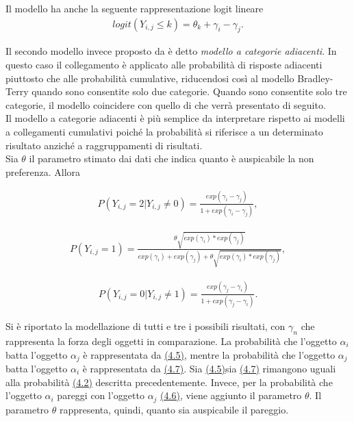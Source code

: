 Il modello ha anche la seguente rappresentazione logit lineare 
\begin{align}
	logit(Y_{i,j}\leq k) =  \theta_{k} + \gamma_i - \gamma_j.
\end{align}

Il secondo modello invece proposto da \textcite{agresti1992analysis} è detto \emph{modello a categorie adiacenti}. In questo caso il collegamento è applicato alle probabilità di risposte adiacenti piuttosto che alle probabilità cumulative, riducendosi così al modello Bradley-Terry quando sono consentite solo due categorie. Quando sono consentite solo tre categorie, il modello coincidere con quello di \textcite{davidson1970extending} che verrà presentato di seguito.\\
Il modello a categorie adiacenti è più semplice da interpretare rispetto ai modelli a collegamenti cumulativi poiché la probabilità si riferisce a un determinato risultato anziché a raggruppamenti di risultati. \\
Sia $\theta$ il parametro stimato dai dati che indica quanto è auspicabile la non preferenza. Allora \autocite{davidson1970extending}

\begin{align}
	P(Y_{i,j} = 2 | Y_{i,j} \not = 0) =  \frac{exp(\gamma_{i} - \gamma_{j})}{1 + exp(\gamma_{i} - \gamma_{j})}, \label{for:4.5}
\end{align}
	
\begin{align}
	P(Y_{i,j} = 1) =  \frac{\theta \sqrt{exp(\gamma_{i}) * exp(\gamma_{j})}}{exp(\gamma_{i}) + exp(\gamma_{j}) + \theta\sqrt{exp(\gamma_{i}) * exp(\gamma_{j})}}, \label{for:4.6}
\end{align}

\begin{align}	
	P(Y_{i,j} = 0 | Y_{i,j} \not = 1) =  \frac{exp(\gamma_{j} - \gamma_{i})}{1 + exp(\gamma_{j} - \gamma_{i})}\label{for:4.7}.
\end{align}

Si è riportato la modellazione di tutti e tre i possibili risultati, con $\gamma_{n}$ che rappresenta la forza degli oggetti in comparazione. La probabilità che l'oggetto $\alpha_{i}$ batta l'oggetto $\alpha_{j}$ è rappresentata da \hyperref[for:4.5]{(4.5)}, mentre la probabilità che l'oggetto $\alpha_{j}$ batta l'oggetto $\alpha_{i}$ è rappresentata da  \hyperref[for:4.7]{(4.7)}. Sia \hyperref[for:4.5]{(4.5)}sia \hyperref[for:4.7]{(4.7)} rimangono uguali alla probabilità \hyperref[for:3.1]{(4.2)} descritta precedentemente. Invece, per la probabilità che l'oggetto $\alpha_{i}$ pareggi con l'oggetto $\alpha_{j}$ \hyperref[for:4.6]{(4.6)}, viene aggiunto il parametro $\theta$. Il parametro $\theta$ rappresenta, quindi, quanto sia auspicabile il pareggio. \\

